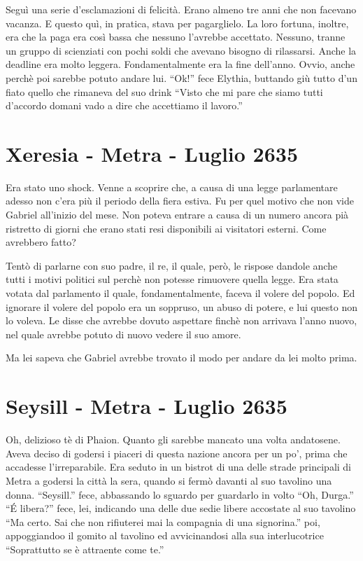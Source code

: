     Seguì una serie d'esclamazioni di felicità. Erano almeno tre anni che
    non facevano vacanza. E questo quì, in pratica, stava per pagarglielo.
    La loro fortuna, inoltre, era che la paga era così bassa che nessuno
    l'avrebbe accettato. Nessuno, tranne un gruppo di scienziati con pochi
    soldi che avevano bisogno di rilassarsi. Anche la deadline era molto
    leggera. Fondamentalmente era la fine dell'anno. Ovvio, anche perchè
    poi sarebbe potuto andare lui. ``Ok!'' fece Elythia, buttando giù tutto
    d'un fiato quello che rimaneva del suo drink ``Visto che mi pare che
    siamo tutti d'accordo domani vado a dire che accettiamo il lavoro.''

  \section{Xeresia - Metra - Luglio 2635}
    
    Era stato uno shock. Venne a scoprire che, a causa di una legge
    parlamentare adesso non c'era più il periodo della fiera estiva. Fu per
    quel motivo che non vide Gabriel all'inizio del mese. Non poteva
    entrare a causa di un numero ancora pià ristretto di giorni che erano
    stati resi disponibili ai visitatori esterni. Come avrebbero fatto?

    Tentò di parlarne con suo padre, il re, il quale, però, le rispose
    dandole anche tutti i motivi politici sul perchè non potesse rimuovere
    quella legge. Era stata votata dal parlamento il quale,
    fondamentalmente, faceva il volere del popolo. Ed ignorare il volere
    del popolo era un soppruso, un abuso di potere, e lui questo non lo
    voleva. Le disse che avrebbe dovuto aspettare finchè non arrivava
    l'anno nuovo, nel quale avrebbe potuto di nuovo vedere il suo amore.

    Ma lei sapeva che Gabriel avrebbe trovato il modo per andare da lei
    molto prima.

  \section{Seysill - Metra - Luglio 2635}

    Oh, delizioso tè di Phaion. Quanto gli sarebbe mancato una volta
    andatosene. Aveva deciso di godersi i piaceri di questa nazione ancora
    per un po', prima che accadesse l'irreparabile. Era seduto in un
    bistrot di una delle strade principali di Metra a godersi la città la
    sera, quando si fermò davanti al suo tavolino una donna. ``Seysill.''
    fece, abbassando lo sguardo per guardarlo in volto ``Oh, Durga.'' ``\'E
    libera?'' fece, lei, indicando una delle due sedie libere accostate al
    suo tavolino ``Ma certo. Sai che non rifiuterei mai la compagnia di una
    signorina.'' poi, appoggiandoo il gomito al tavolino ed avvicinandosi
    alla sua interlucotrice ``Soprattutto se è attraente come te.''

